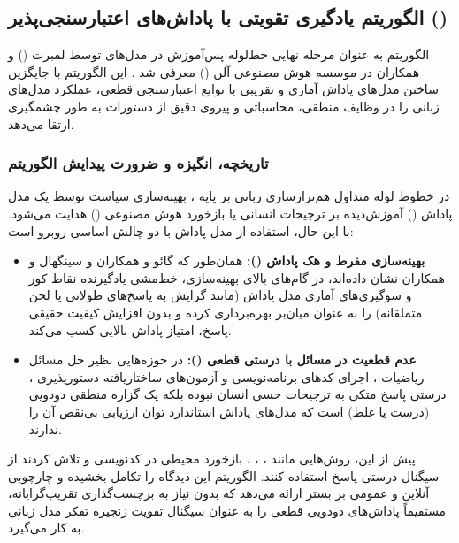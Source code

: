 \subsection{الگوریتم یادگیری تقویتی با پاداش‌های اعتبارسنجی‌پذیر ()}

الگوریتم  به عنوان مرحله نهایی خط‌لوله پس‌آموزش در مدل‌های  توسط لمبرت () و همکاران در موسسه هوش مصنوعی آلن () معرفی شد \cite{lambert2024tulu3}. این الگوریتم با جایگزین ساختن مدل‌های پاداش آماری و تقریبی با توابع اعتبارسنجی قطعی، عملکرد مدل‌های زبانی را در وظایف منطقی، محاسباتی و پیروی دقیق از دستورات به طور چشمگیری ارتقا می‌دهد.

\subsubsection*{تاریخچه، انگیزه و ضرورت پیدایش الگوریتم}

در خطوط لوله متداول هم‌ترازسازی زبانی بر پایه  \cite{christiano2017deep, stiennon2020learning, ouyang2022training}، بهینه‌سازی سیاست توسط یک مدل پاداش () آموزش‌دیده بر ترجیحات انسانی یا بازخورد هوش مصنوعی () هدایت می‌شود. با این حال، استفاده از مدل پاداش با دو چالش اساسی روبرو است:
\begin{itemize}
    \item \textbf{بهینه‌سازی مفرط و هک پاداش ():} همان‌طور که گائو و همکاران \cite{gao2023scaling} و سینگهال و همکاران \cite{singhal2024long} نشان داده‌اند، در گام‌های بالای بهینه‌سازی، خط‌مشی یادگیرنده نقاط کور و سوگیری‌های آماری مدل پاداش (مانند گرایش به پاسخ‌های طولانی یا لحن متملقانه) را به عنوان میان‌بر بهره‌برداری کرده و بدون افزایش کیفیت حقیقی پاسخ، امتیاز پاداش بالایی کسب می‌کند.
    \item \textbf{عدم قطعیت در مسائل با درستی قطعی ():} در حوزه‌هایی نظیر حل مسائل ریاضیات \cite{cobbe2021training, hendrycks2021measuring}، اجرای کدهای برنامه‌نویسی و آزمون‌های ساختاریافته دستورپذیری \cite{zhou2023instruction}، درستی پاسخ متکی به ترجیحات حسی انسان نبوده بلکه یک گزاره منطقی دودویی (درست یا غلط) است که مدل‌های پاداش استاندارد توان ارزیابی بی‌نقص آن را ندارند.
\end{itemize}

پیش از این، روش‌هایی مانند  \cite{zelikman2022star}،  \cite{zelikman2024quiet}،  \cite{hoffman2023training}، بازخورد محیطی در کدنویسی \cite{gehring2024rlef} و  \cite{kazemnejad2024vineppo} تلاش کردند از سیگنال درستی پاسخ استفاده کنند. الگوریتم  این دیدگاه را تکامل بخشیده و چارچوبی آنلاین و عمومی بر بستر  ارائه می‌دهد که بدون نیاز به برچسب‌گذاری تقریب‌گرایانه، مستقیماً پاداش‌های دودویی قطعی را به عنوان سیگنال تقویت زنجیره تفکر مدل زبانی به کار می‌گیرد.

